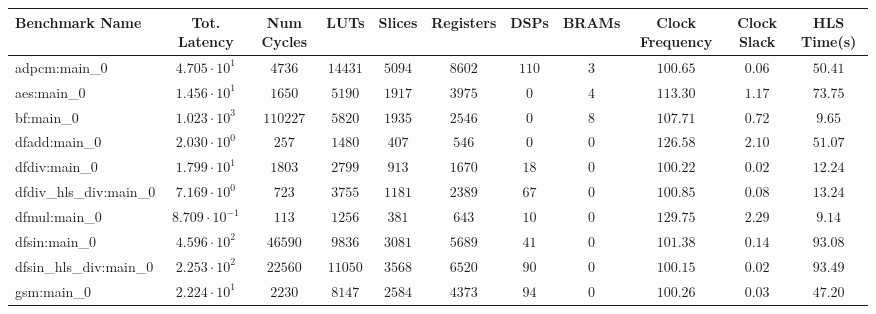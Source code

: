 \begin{tabular}{|l|c|c|c|c|c|c|c|c|c|c|}
\hline
Benchmark Name          & Tot. Latency            & Num Cycles & LUTs      & Slices    & Registers & DSPs    & BRAMs  & Clock Frequency & Clock Slack & HLS Time(s) \\
\hline
adpcm:main\_0           & $ 4.705 \cdot 10^{1}  $ & $ 4736   $ & $ 14431 $ & $ 5094  $ & $ 8602  $ & $ 110 $ & $ 3  $ & $ 100.65      $ & $ 0.06    $ & $ 50.41   $ \\
aes:main\_0             & $ 1.456 \cdot 10^{1}  $ & $ 1650   $ & $ 5190  $ & $ 1917  $ & $ 3975  $ & $ 0   $ & $ 4  $ & $ 113.30      $ & $ 1.17    $ & $ 73.75   $ \\
bf:main\_0              & $ 1.023 \cdot 10^{3}  $ & $ 110227 $ & $ 5820  $ & $ 1935  $ & $ 2546  $ & $ 0   $ & $ 8  $ & $ 107.71      $ & $ 0.72    $ & $ 9.65    $ \\
dfadd:main\_0           & $ 2.030 \cdot 10^{0}  $ & $ 257    $ & $ 1480  $ & $ 407   $ & $ 546   $ & $ 0   $ & $ 0  $ & $ 126.58      $ & $ 2.10    $ & $ 51.07   $ \\
dfdiv:main\_0           & $ 1.799 \cdot 10^{1}  $ & $ 1803   $ & $ 2799  $ & $ 913   $ & $ 1670  $ & $ 18  $ & $ 0  $ & $ 100.22      $ & $ 0.02    $ & $ 12.24   $ \\
dfdiv\_hls\_div:main\_0 & $ 7.169 \cdot 10^{0}  $ & $ 723    $ & $ 3755  $ & $ 1181  $ & $ 2389  $ & $ 67  $ & $ 0  $ & $ 100.85      $ & $ 0.08    $ & $ 13.24   $ \\
dfmul:main\_0           & $ 8.709 \cdot 10^{-1} $ & $ 113    $ & $ 1256  $ & $ 381   $ & $ 643   $ & $ 10  $ & $ 0  $ & $ 129.75      $ & $ 2.29    $ & $ 9.14    $ \\
dfsin:main\_0           & $ 4.596 \cdot 10^{2}  $ & $ 46590  $ & $ 9836  $ & $ 3081  $ & $ 5689  $ & $ 41  $ & $ 0  $ & $ 101.38      $ & $ 0.14    $ & $ 93.08   $ \\
dfsin\_hls\_div:main\_0 & $ 2.253 \cdot 10^{2}  $ & $ 22560  $ & $ 11050 $ & $ 3568  $ & $ 6520  $ & $ 90  $ & $ 0  $ & $ 100.15      $ & $ 0.02    $ & $ 93.49   $ \\
gsm:main\_0             & $ 2.224 \cdot 10^{1}  $ & $ 2230   $ & $ 8147  $ & $ 2584  $ & $ 4373  $ & $ 94  $ & $ 0  $ & $ 100.26      $ & $ 0.03    $ & $ 47.20   $ \\

\end{tabular}
